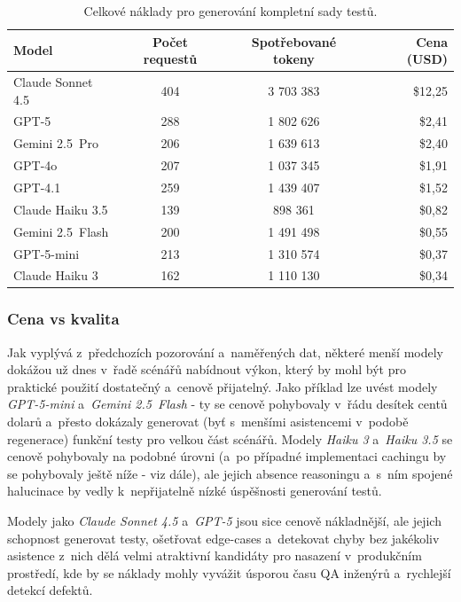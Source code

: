 \documentclass[czech, ing, kiv, he, iso690numb, viewonly]{fasthesis}
\begin{document}
\begin{table}[H]
    \centering
    \footnotesize
    \begin{tabular}{|l|c|c|r|}
        \hline
        \textbf{Model} & \textbf{Počet requestů} & \textbf{Spotřebované tokeny} & \textbf{Cena (USD)} \\ \hline
        Claude Sonnet 4.5 & 404 & 3 703 383 & \$12,25 \\ \hline
        GPT-5 & 288 & 1 802 626 & \$2,41 \\ \hline
        Gemini 2.5~Pro & 206 & 1 639 613 & \$2,40 \\ \hline
        GPT-4o & 207 & 1 037 345 & \$1,91 \\ \hline
        GPT-4.1 & 259 & 1 439 407 & \$1,52 \\ \hline
        Claude Haiku 3.5 & 139 & 898 361 & \$0,82 \\ \hline
        Gemini 2.5~Flash & 200 & 1 491 498 & \$0,55 \\ \hline
        GPT-5-mini & 213 & 1 310 574 & \$0,37 \\ \hline
        Claude Haiku 3 & 162 & 1 110 130 & \$0,34 \\ \hline
    \end{tabular}
    \caption{\protect\centering Celkové náklady pro generování kompletní sady testů.}
    \label{tab:economic-results}
\end{table}

\subsubsection*{Cena vs kvalita}
Jak vyplývá z~předchozích pozorování a~naměřených dat, 
některé menší modely dokážou už dnes v~řadě scénářů nabídnout výkon, který by mohl 
být pro praktické použití dostatečný a~cenově přijatelný. Jako příklad lze uvést modely 
\textit{GPT-5-mini} a~\textit{Gemini 2.5~Flash} - ty se cenově pohybovaly v~řádu desítek centů dolarů 
a~přesto dokázaly generovat (byť s~menšími asistencemi v~podobě regenerace) funkční testy pro 
velkou část scénářů. Modely \textit{Haiku 3} a~\textit{Haiku 3.5} se cenově pohybovaly na podobné úrovni 
(a~po případné implementaci cachingu by se pohybovaly ještě níže - viz dále), ale jejich absence reasoningu 
a~s~ním spojené halucinace by vedly k~nepřijatelně nízké úspěšnosti generování testů.

Modely jako \textit{Claude Sonnet 4.5} a~\textit{GPT-5} jsou sice cenově nákladnější, 
ale jejich schopnost generovat testy, ošetřovat edge-cases a~detekovat chyby bez jakékoliv asistence z~nich dělá 
velmi atraktivní kandidáty pro nasazení v~produkčním prostředí, 
kde by se náklady mohly vyvážit úsporou času QA inženýrů a~rychlejší detekcí defektů.
\end{document}
